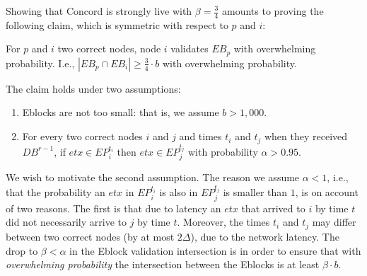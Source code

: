 Showing that Concord is strongly live with $\beta=\frac{3}{4}$ amounts to proving the following claim, which is symmetric with respect to $p$ and $i$:
\begin{claim} {}For $p$ and $i$ two correct nodes, node $i$ validates $EB_p$ with overwhelming probability. I.e., $|EB_p\cap EB_i|\geq \frac{3}{4}\cdot b$ with overwhelming probability.
\end{claim}
The claim holds under two assumptions:
\begin{enumerate}
\item Eblocks are not too small: that is, we assume $b>1,000$.
\item For every two correct nodes $i$ and $j$ and times $t_i$ and $t_j$ when they received $DB^{r-1}$, if $etx\in EP_i^{t_i}$ then $etx\in EP_j^{t_j}$ with probability $\alpha>0.95$. \label{rep:assumption2}
\end{enumerate}	
We wish to motivate the second assumption. The reason we assume $\alpha<1$, i.e., that the probability an $etx$ in $EP^{t_i}_i$ is also in $EP_j^{t_j}$ is smaller than $1$, is on account of two reasons. The first is that due to latency an $etx$ that arrived to $i$ by time $t$ did not necessarily arrive to $j$ by time $t$. Moreover, the times $t_i$ and $t_j$ may differ between two correct nodes (by at most $2\Delta$), due to the network latency.
The drop to $\beta<\alpha$ in the Eblock validation intersection is in order to ensure that with \emph{overwhelming probability} the intersection between the Eblocks is at least $\beta\cdot b$.

